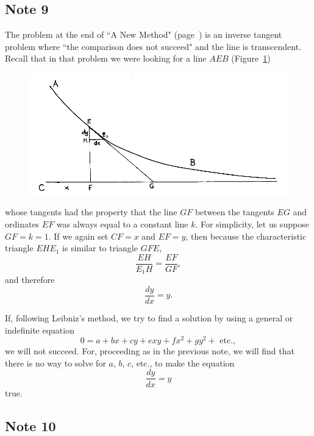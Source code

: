 \documentclass[polutonikogreek,english,twoside,openright]{article}
\begin{document}
\subsection*{Note 9}
\label{crg9}

The problem at the end of ``A New Method" (page~\pageref{begdeb}) is
an inverse tangent problem where ``the comparison does not succeed"
and the line is transcendent.  Recall that in that problem we were
looking for a line $AEB$ (Figure~\ref{transcurv})
\begin{figure}[htp]
\begin{center}
\includegraphics[width=\textwidth]{fig/Figure34}
\caption{}
\label{transcurv}
\vspace{-10pt}
\end{center}
\end{figure} whose tangents had the property that the line $GF$
between the tangents $EG$ and ordinates $EF$ was always equal to a
constant line $k$.  For simplicity, let us suppose $GF= k=1$.  If we
again set $CF =x$ and $EF=y$, then because the characteristic triangle
$EHE_1$ is similar to triangle $GFE$,
$$\frac{EH}{E_1H} = \frac{EF}{GF},$$
and therefore
\begin{equation}
\frac{dy}{dx} = y.
\end{equation}

If, following Leibniz's method, we try to find a solution by using a general or indefinite equation
\begin{equation}
 0 = a + bx + cy + exy + fx^2 + gy^2 + \mbox{ etc.},
 \end{equation}
 we will not succeed.  For, proceeding as in the previous note, we
 will find that there is no way to solve for $a$, $b$, $c$, etc., to
 make the equation
$$\frac{dy}{dx} = y$$
true.
\setcounter{equation}{0}

\subsection*{Note 10}
\label{crg10}
\end{document}
